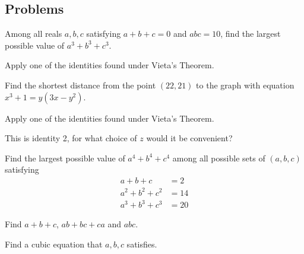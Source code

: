 \documentclass[../jarvis.tex]{subfiles}
\begin{document}
\subsection{Problems}
\problem[2019 SMO(O) P8]Among all reals $a,b,c$ satisfying $a+b+c=0$ and $abc=10$, find the largest possible value of $a^3+b^3+c^3$.
\begin{hints}
    \begin{hint}
        Apply one of the identities found under Vieta's Theorem.
    \end{hint}
\end{hints}
\problem[2018 SMO(O) P11]Find the shortest distance from the point $(22,21)$ to the graph with equation $x^3+1=y(3x-y^2)$.
\begin{hints}
    \begin{hint}
        Apply one of the identities found under Vieta's Theorem.
    \end{hint}
    \begin{hint}
        This is identity 2, for what choice of $z$ would it be convenient? 
    \end{hint}
\end{hints}
\problem[2021 SMO(O) P9]Find the largest possible value of $a^4+b^4+c^4$ among all possible sets of $(a,b,c)$ satisfying
\begin{align*}
    a+b+c&=2\\
    a^2+b^2+c^2&=14\\
    a^3+b^3+c^3&=20
\end{align*}
\begin{hints}
    \begin{hint}
        Find $a+b+c$, $ab+bc+ca$ and $abc$.
    \end{hint}
    \begin{hint}
        Find a cubic equation that $a,b,c$ satisfies.
    \end{hint}
\end{hints}
\end{document}
